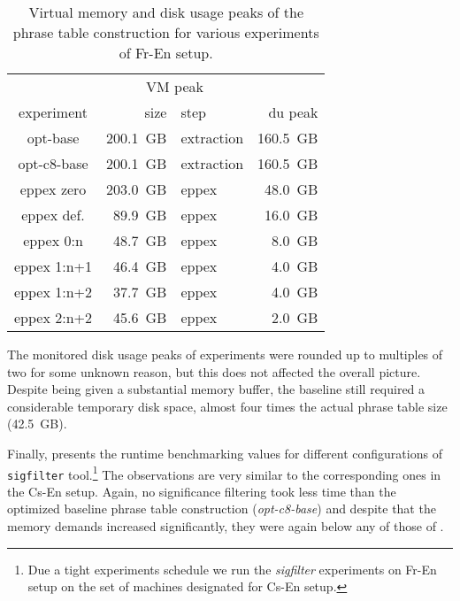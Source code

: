 \begin{table}[ht]
\centering
\begin{tabular}{ | c | r l | r | }
\hline
 & \multicolumn{2}{|c|}{VM peak} & \\
experiment & size & step & du peak \\
\hline
\hline
opt-base       & 200.1~GB & extraction & 160.5~GB \\
opt-c8-base    & 200.1~GB & extraction & 160.5~GB \\
eppex zero     & 203.0~GB &      eppex &  48.0~GB \\
\hline
eppex def.     &  89.9~GB &      eppex &  16.0~GB \\
eppex 0:n      &  48.7~GB &      eppex &   8.0~GB \\
eppex 1:n+1    &  46.4~GB &      eppex &   4.0~GB \\
eppex 1:n+2    &  37.7~GB &      eppex &   4.0~GB \\
eppex 2:n+2    &  45.6~GB &      eppex &   2.0~GB \\
\hline
\end{tabular}
\caption{\label{fr-en-vm-and-disk-usage-peaks}
Virtual memory and disk usage peaks of the phrase table construction for various experiments of Fr-En setup.}
\end{table}

The monitored disk usage peaks of \eppex{} experiments were rounded up
to multiples of two for some unknown reason, but this does not affected
the overall picture.
Despite being given a substantial memory buffer, the baseline still
required a considerable temporary disk space, almost four times the
actual phrase table size (42.5~GB).

Finally,  presents the runtime benchmarking
values for different configurations of \texttt{sigfilter} tool.\footnote{Due a tight
experiments schedule we run the \emph{sigfilter} experiments on Fr-En setup on the set of
machines designated for Cs-En setup.}
The observations are very similar to the corresponding ones in the Cs-En setup.
Again, no significance filtering took less time than the optimized baseline phrase table
construction (\emph{opt-c8-base}) and despite that the memory demands increased
significantly, they were again below any of those of \eppex{}.

